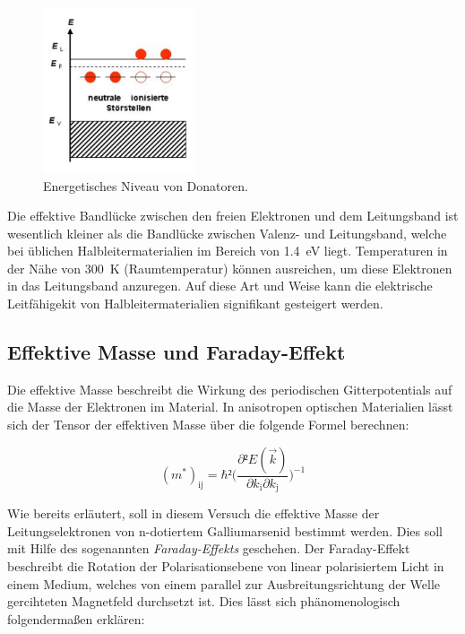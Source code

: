 \begin{figure}[H]
    \centering
    \includegraphics[width=0.4\textwidth]{nDot.png}
    \caption{Energetisches Niveau von Donatoren.}
    \label{fig:nDot}
\end{figure}

\noindent Die effektive Bandlücke zwischen den freien Elektronen und dem Leitungsband ist wesentlich kleiner als die Bandlücke 
zwischen Valenz- und Leitungsband, welche bei üblichen Halbleitermaterialien im Bereich von \qty{1.4}{\electronvolt} liegt. Temperaturen 
in der Nähe von \qty{300}{\kelvin} (Raumtemperatur) können ausreichen, um diese Elektronen in das Leitungsband anzuregen. 
Auf diese Art und Weise kann die elektrische Leitfähigekit von Halbleitermaterialien signifikant gesteigert werden. 

\subsection{Effektive Masse und Faraday-Effekt}

\noindent Die effektive Masse beschreibt die Wirkung des periodischen Gitterpotentials auf die Masse der Elektronen im Material.
In anisotropen optischen Materialien lässt sich der Tensor der effektiven Masse über die folgende Formel berechnen:

\begin{equation}
    (m^{\ast})_{\text{ij}} = \hbar²\biggl(\frac{\partial²E(\vec{k})}{\partial{}k_{\text{i}}\partial{}k_{\text{j}}}\biggr)^{-1}
    \label{eqn:meff}
\end{equation}

\noindent Wie bereits erläutert, soll in diesem Versuch die effektive Masse der Leitungselektronen von n-dotiertem Galliumarsenid bestimmt 
werden. Dies soll mit Hilfe des sogenannten \textit{Faraday-Effekts} geschehen. Der Faraday-Effekt beschreibt die Rotation der 
Polarisationsebene von linear polarisiertem Licht in einem Medium, welches von einem parallel zur Ausbreitungsrichtung der Welle gercihteten 
Magnetfeld durchsetzt ist. Dies lässt sich phänomenologisch folgendermaßen erklären: \\

